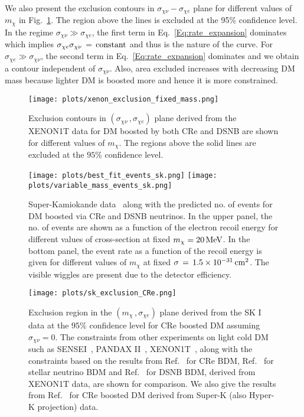\documentclass[11pt,prd,twocolumn,nofootinbib,reprint,superscriptaddress,longbibliography,colorlinks=true,citecolor=blue]{revtex4-1}
\begin{document}
We also present the exclusion contours in $\sigma_{\chi \nu}- \sigma_{\chi e} $ plane for different values of $m_\chi$ in Fig.~\ref{Fig:chisqr_XENON1T_22}. The region above the lines is excluded at the 95\% confidence level. In the regime $\sigma_{\chi \nu}\gg\sigma_{\chi e}$, the first term in Eq.~\ref{Eq:rate_expansion} dominates which implies $\sigma_{\chi e}\sigma_{\chi \nu}\,=\,{\rm constant}$ and thus is the nature of the curve.  For $\sigma_{\chi e}\gg\sigma_{\chi \nu}$, the second term in Eq.~\ref{Eq:rate_expansion} dominates and we obtain a contour independent of $\sigma_{\chi \nu}$. Also, area excluded increases with decreasing DM mass because lighter DM is boosted more and hence it is more constrained. 

\begin{figure}
\centering
\texttt{[image: plots/xenon\_exclusion\_fixed\_mass.png]}
\caption{Exclusion contours in $(\sigma_{\chi \nu}\,, \sigma_{\chi e})$ plane derived from the XENON1T data for DM boosted by both CRe and DSNB are shown for different values of $m_\chi$. The regions above the solid lines are excluded at the $95\%$ confidence level.  }
\protect\label{Fig:chisqr_XENON1T_22}
\end{figure}

\begin{figure}[h!]
\centering
\texttt{[image: plots/best\_fit\_events\_sk.png]}\hfill
\texttt{[image: plots/variable\_mass\_events\_sk.png]}
\caption{Super-Kamiokande data~\cite{Super-Kamiokande:2011lwo} along with the predicted no. of events for DM boosted via CRe and DSNB neutrinos. In the upper panel, the no. of events are shown as a function of the electron recoil energy for different values of cross-section at fixed $m_\chi=20\,{\rm MeV}$. In the bottom panel,  the event rate as a function of the recoil energy is given for different values of $m_\chi$ at fixed $\sigma\,=\,1.5\times10^{-31}\,{\rm cm^2}$. The visible wiggles are present due to the detector efficiency.}
\protect\label{Fig:sk_data}
\end{figure}


\begin{figure}
\centering
\texttt{[image: plots/sk\_exclusion\_CRe.png]}
\caption{Exclusion region in the $(m_\chi\,,\sigma_{\chi e})$ plane derived from the SK I data at the $95\%$ confidence level for CRe boosted DM assuming $\sigma_{\chi \nu} = 0$. The constraints from other experiments on light cold DM such as SENSEI~\cite{SENSEI:2020dpa}, PANDAX II~\cite{PandaX-II:2021nsg}, XENON1T~\cite{XENON:2019gfn}, along with the constraints based on the results from Ref.~\cite{Jho:2020sku} for CRe BDM, Ref.~\cite{Jho:2021rmn} for stellar neutrino BDM and Ref.~\cite{Das:2021lcr} for DSNB BDM, derived from XENON1T data, are shown for comparison. We also give the results from Ref.~\cite{Cappiello:2019qsw} for CRe boosted DM derived from Super-K (also Hyper-K projection) data. }
\protect\label{Fig:chisqr_sk_1}
\end{figure}
\end{document}
